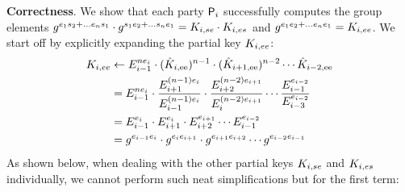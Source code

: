 \medskip
\textbf{Correctness}. We show that each party $\User[i]$ successfully computes the group elements $g^{e_1s_2 + \dots e_ns_1}\cdot g^{s_1e_2 + \dots s_ne_1} = \groupsek{i} \cdot \groupesk{i}$ and $g^{e_1e_2 + \dots e_ne_1} = \groupeek{i}$.
We start off by explicitly expanding the partial key $\groupeek{i}$:
\begin{align*}
	\groupeek{i} &\gets E_{i-1}^{n\esk_i} \cdot (\tempeek{i})^{n-1} \cdot (\tempeek{i+1})^{n-2} \cdots \tempeek{i-2}\\
	&= E_{i-1}^{n\esk_i} \cdot  \dfrac{\epk_{i+1}^{(n-1)\esk_i}}{\epk_{i-1}^{(n-1)\esk_i}} \cdot \dfrac{\epk_{i+2}^{(n-2)\esk_{i+1}}}{\epk_{i}^{(n-2)\esk_{i+1}}} \cdots  \dfrac{\epk_{i-1}^{\esk_{i-2}}}{\epk_{i-3}^{\esk_{i-2}}}  \\
	&= E_{i-1}^{\esk_i} \cdot  \epk_{i+1}^{\esk_i} \cdot \epk_{i+2}^{\esk_{i+1}} \cdots  \epk_{i-1}^{\esk_{i-2}}  \\
	&= g^{\esk_{i-1}\esk_i} \cdot  g^{\esk_i\esk_{i+1}} \cdot g^{\esk_{i+1}\esk_{i+2}} \cdots  g^{\esk_{i-2}\esk_{i-1}}  \\
\end{align*}
As shown below, when dealing with the other partial keys  $\groupsek{i}$ and $\groupesk{i}$  individually, we cannot perform such neat simplifications but for the first term:


